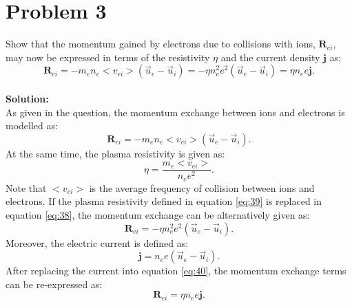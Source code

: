 \documentclass[11pt]{amsart}
\begin{document}
\section*{Problem 3 }
Show that the momentum gained by electrons due to collisions with ions, $\mathbf{R}_{ei}$, may now be expressed in terms of the resistivity $\eta$ and the current density $\mathbf{j}$ as; 
\begin{equation*}
\mathbf{R}_{ei}=-m_e n_e <v_{ei}>(\vec{u}_e-\vec{u}_i)=-\eta n_{e}^2 e^2 (\vec{u}_e-\vec{u}_i)=\eta n_{e}e\mathbf{j}.
\end{equation*}
\\
\textbf{Solution:}\\
As given in the question, the momentum exchange between ions and electrons is modelled as:
\begin{equation}
\label{eq:38}
\mathbf{R}_{ei}=-m_e n_e <v_{ei}>(\vec{u}_e-\vec{u}_i).
\end{equation}
At the same time, the plasma resistivity is given as:
\begin{equation}
\label{eq:39}
\eta=\frac{m_e <v_{ei}>}{n_e e^2}.
\end{equation}
Note that $<v_{ei}>$ is the average frequency of collision between ions and electrons. If the plasma resistivity defined in equation \ref{eq:39} is replaced in equation \ref{eq:38}, the momentum exchange can be alternatively given as:
\begin{equation}
\label{eq:40}
\mathbf{R}_{ei}=-\eta n_{e}^2 e^2 (\vec{u}_e-\vec{u}_i).
\end{equation}
Moreover, the electric current is defined as:
\begin{equation}
\label{eq:41}
\mathbf{j}=n_{e} e (\vec{u}_e-\vec{u}_i).
\end{equation}
After replacing the current into equation \ref{eq:40}, the momentum exchange terms can be re-expressed as:
\begin{equation}
\mathbf{R}_{ei}=\eta n_{e}e\mathbf{j}.
\end{equation}
\end{document}
